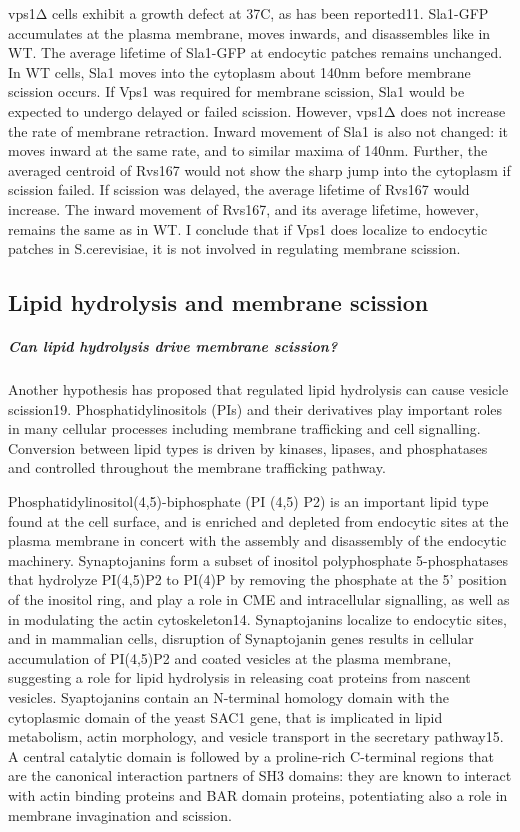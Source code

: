 	
	\vspace{5mm}
	vps1Δ cells exhibit a growth defect at 37C, as has been reported11. Sla1-GFP accumulates at the plasma membrane, moves inwards, and disassembles like in WT. The average lifetime of Sla1-GFP at endocytic patches remains unchanged. In WT cells, Sla1 moves into the cytoplasm about 140nm before membrane scission occurs. If Vps1 was required for membrane scission, Sla1 would be expected to undergo delayed or failed scission. However, vps1Δ does not increase the rate of membrane retraction. Inward movement of Sla1 is also not changed: it moves inward at the same rate, and to similar maxima of 140nm. Further, the averaged centroid of Rvs167 would not show the sharp jump into the cytoplasm if scission failed. If scission was delayed, the average lifetime of Rvs167 would increase. The inward movement of Rvs167, and its average lifetime, however, remains the same as in WT. I conclude that if Vps1 does localize to endocytic patches in S.cerevisiae, it is not involved in regulating membrane scission.  


	\subsection{Lipid hydrolysis and membrane scission}
	
	\subparagraph{Can lipid hydrolysis drive membrane scission?}
	Another hypothesis has proposed that regulated lipid hydrolysis can cause vesicle scission19. Phosphatidylinositols (PIs) and their derivatives play important roles in many cellular processes including membrane trafficking and cell signalling. Conversion between lipid types is driven by kinases, lipases, and phosphatases and controlled throughout the membrane trafficking pathway. 
	
	\vspace{5mm}
	Phosphatidylinositol(4,5)-biphosphate (PI (4,5) P2) is an important lipid type found at the cell surface, and is enriched and depleted from endocytic sites at the plasma membrane in concert with the assembly and disassembly of the endocytic machinery. Synaptojanins form a subset of inositol polyphosphate 5-phosphatases that hydrolyze PI(4,5)P2 to PI(4)P by removing the phosphate at the 5’ position of the inositol ring, and play a role in CME and intracellular signalling, as well as in modulating the actin cytoskeleton14. Synaptojanins localize to endocytic sites, and in mammalian cells, disruption of Synaptojanin genes results in cellular accumulation of PI(4,5)P2 and coated vesicles at the plasma membrane, suggesting a role for lipid hydrolysis in releasing coat proteins from nascent vesicles. Syaptojanins contain an N-terminal homology domain with the cytoplasmic domain of the yeast SAC1 gene, that is implicated in lipid metabolism, actin morphology, and vesicle transport in the secretary pathway15. A central catalytic domain is followed by a proline-rich C-terminal regions that are the canonical interaction partners of SH3 domains: they are known to interact with actin binding proteins and BAR domain proteins, potentiating also a role in membrane invagination and scission. 
		
